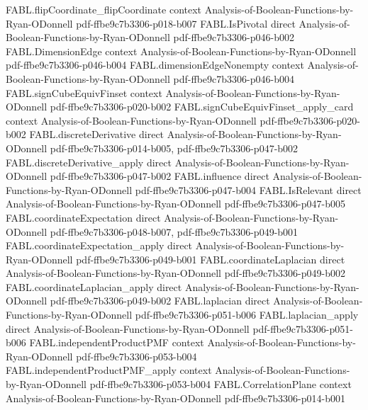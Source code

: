 \begin{theorem}
\proofstep
  {FABL.flipCoordinate_flipCoordinate}
  {context}
  {Analysis-of-Boolean-Functions-by-Ryan-ODonnell}
  {pdf-ffbe9c7b3306-p018-b007}
\proofstep
  {FABL.IsPivotal}
  {direct}
  {Analysis-of-Boolean-Functions-by-Ryan-ODonnell}
  {pdf-ffbe9c7b3306-p046-b002}
\proofstep
  {FABL.DimensionEdge}
  {context}
  {Analysis-of-Boolean-Functions-by-Ryan-ODonnell}
  {pdf-ffbe9c7b3306-p046-b004}
\proofstep
  {FABL.dimensionEdgeNonempty}
  {context}
  {Analysis-of-Boolean-Functions-by-Ryan-ODonnell}
  {pdf-ffbe9c7b3306-p046-b004}
\proofstep
  {FABL.signCubeEquivFinset}
  {context}
  {Analysis-of-Boolean-Functions-by-Ryan-ODonnell}
  {pdf-ffbe9c7b3306-p020-b002}
\proofstep
  {FABL.signCubeEquivFinset_apply_card}
  {context}
  {Analysis-of-Boolean-Functions-by-Ryan-ODonnell}
  {pdf-ffbe9c7b3306-p020-b002}
\proofstep
  {FABL.discreteDerivative}
  {direct}
  {Analysis-of-Boolean-Functions-by-Ryan-ODonnell}
  {pdf-ffbe9c7b3306-p014-b005,
    pdf-ffbe9c7b3306-p047-b002}
\proofstep
  {FABL.discreteDerivative_apply}
  {direct}
  {Analysis-of-Boolean-Functions-by-Ryan-ODonnell}
  {pdf-ffbe9c7b3306-p047-b002}
\proofstep
  {FABL.influence}
  {direct}
  {Analysis-of-Boolean-Functions-by-Ryan-ODonnell}
  {pdf-ffbe9c7b3306-p047-b004}
\proofstep
  {FABL.IsRelevant}
  {direct}
  {Analysis-of-Boolean-Functions-by-Ryan-ODonnell}
  {pdf-ffbe9c7b3306-p047-b005}
\proofstep
  {FABL.coordinateExpectation}
  {direct}
  {Analysis-of-Boolean-Functions-by-Ryan-ODonnell}
  {pdf-ffbe9c7b3306-p048-b007,
    pdf-ffbe9c7b3306-p049-b001}
\proofstep
  {FABL.coordinateExpectation_apply}
  {direct}
  {Analysis-of-Boolean-Functions-by-Ryan-ODonnell}
  {pdf-ffbe9c7b3306-p049-b001}
\proofstep
  {FABL.coordinateLaplacian}
  {direct}
  {Analysis-of-Boolean-Functions-by-Ryan-ODonnell}
  {pdf-ffbe9c7b3306-p049-b002}
\proofstep
  {FABL.coordinateLaplacian_apply}
  {direct}
  {Analysis-of-Boolean-Functions-by-Ryan-ODonnell}
  {pdf-ffbe9c7b3306-p049-b002}
\proofstep
  {FABL.laplacian}
  {direct}
  {Analysis-of-Boolean-Functions-by-Ryan-ODonnell}
  {pdf-ffbe9c7b3306-p051-b006}
\proofstep
  {FABL.laplacian_apply}
  {direct}
  {Analysis-of-Boolean-Functions-by-Ryan-ODonnell}
  {pdf-ffbe9c7b3306-p051-b006}
\proofstep
  {FABL.independentProductPMF}
  {context}
  {Analysis-of-Boolean-Functions-by-Ryan-ODonnell}
  {pdf-ffbe9c7b3306-p053-b004}
\proofstep
  {FABL.independentProductPMF_apply}
  {context}
  {Analysis-of-Boolean-Functions-by-Ryan-ODonnell}
  {pdf-ffbe9c7b3306-p053-b004}
\proofstep
  {FABL.CorrelationPlane}
  {context}
  {Analysis-of-Boolean-Functions-by-Ryan-ODonnell}
  {pdf-ffbe9c7b3306-p014-b001}

\end{theorem}
